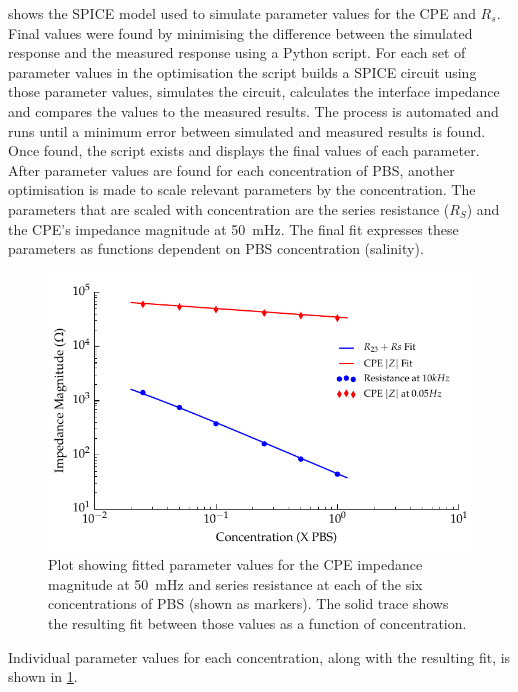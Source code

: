        shows the SPICE model used to simulate parameter values for the CPE and $R_{s}$.
      Final values were found by minimising the difference between the simulated response and the measured response using a Python script.
      For each set of parameter values in the optimisation the script builds a SPICE circuit using those parameter values, simulates the circuit, calculates the interface impedance and compares the values to the measured results.
      The process is automated and runs until a minimum error between simulated and measured results is found.
      Once found, the script exists and displays the final values of each parameter.
      After parameter values are found for each concentration of PBS, another optimisation is made to scale relevant parameters by the concentration.
      The parameters that are scaled with concentration are the series resistance ($R_{S}$) and the CPE's impedance magnitude at \SI{50}{\milli\hertz}.
      The final fit expresses these parameters as functions dependent on PBS concentration (salinity).
      \begin{figure}
        \centering
        \includegraphics{content/pt2/08-InterfaceParameters/graphics/scalingFactors_Displacement_Thesis}
        \caption{\label{fig:pt2-scalingFactors_Displacement_Thesis}Plot showing fitted parameter values for the CPE impedance magnitude at \SI{50}{\milli\hertz} and series resistance at each of the six concentrations of PBS (shown as markers). The solid trace shows the resulting fit between those values as a function of concentration.}
      \end{figure}
      Individual parameter values for each concentration, along with the resulting fit, is shown in \cref{fig:pt2-scalingFactors_Displacement_Thesis}.
